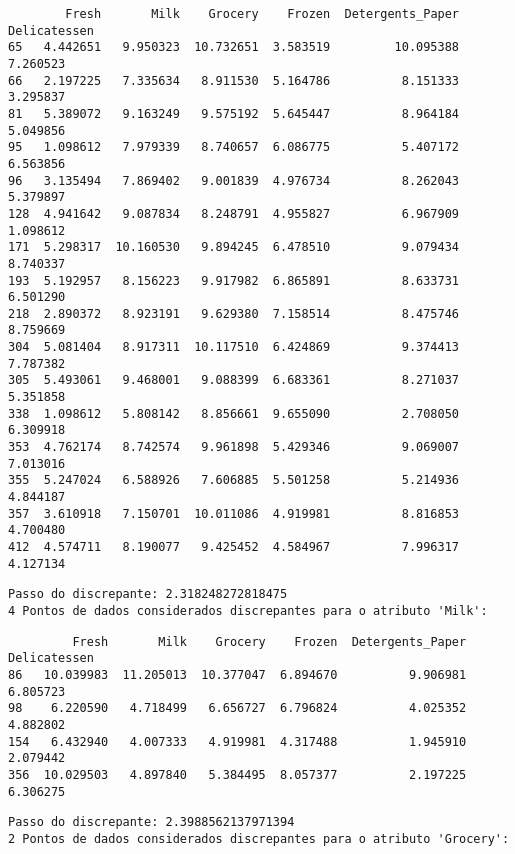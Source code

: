 \documentclass[11pt]{article}
\begin{document}
    
    \begin{verbatim}
        Fresh       Milk    Grocery    Frozen  Detergents_Paper  Delicatessen
65   4.442651   9.950323  10.732651  3.583519         10.095388      7.260523
66   2.197225   7.335634   8.911530  5.164786          8.151333      3.295837
81   5.389072   9.163249   9.575192  5.645447          8.964184      5.049856
95   1.098612   7.979339   8.740657  6.086775          5.407172      6.563856
96   3.135494   7.869402   9.001839  4.976734          8.262043      5.379897
128  4.941642   9.087834   8.248791  4.955827          6.967909      1.098612
171  5.298317  10.160530   9.894245  6.478510          9.079434      8.740337
193  5.192957   8.156223   9.917982  6.865891          8.633731      6.501290
218  2.890372   8.923191   9.629380  7.158514          8.475746      8.759669
304  5.081404   8.917311  10.117510  6.424869          9.374413      7.787382
305  5.493061   9.468001   9.088399  6.683361          8.271037      5.351858
338  1.098612   5.808142   8.856661  9.655090          2.708050      6.309918
353  4.762174   8.742574   9.961898  5.429346          9.069007      7.013016
355  5.247024   6.588926   7.606885  5.501258          5.214936      4.844187
357  3.610918   7.150701  10.011086  4.919981          8.816853      4.700480
412  4.574711   8.190077   9.425452  4.584967          7.996317      4.127134
    \end{verbatim}

    
    \begin{Verbatim}[commandchars=\\\{\}]
Passo do discrepante: 2.318248272818475
4 Pontos de dados considerados discrepantes para o atributo 'Milk':

    \end{Verbatim}

    
    \begin{verbatim}
         Fresh       Milk    Grocery    Frozen  Detergents_Paper  Delicatessen
86   10.039983  11.205013  10.377047  6.894670          9.906981      6.805723
98    6.220590   4.718499   6.656727  6.796824          4.025352      4.882802
154   6.432940   4.007333   4.919981  4.317488          1.945910      2.079442
356  10.029503   4.897840   5.384495  8.057377          2.197225      6.306275
    \end{verbatim}

    
    \begin{Verbatim}[commandchars=\\\{\}]
Passo do discrepante: 2.3988562137971394
2 Pontos de dados considerados discrepantes para o atributo 'Grocery':

    \end{Verbatim}
\end{document}
